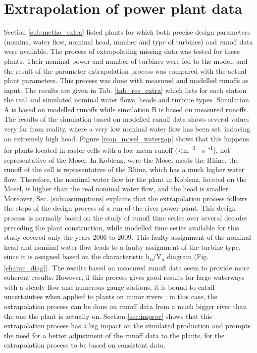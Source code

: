 \section{Extrapolation of power plant data}
\label{sec:missing_data}
Section \ref{sub:metho_extra} listed plants for which both precise design parameters (nominal water flow, nominal head, number and type of turbines) and runoff data were available. The process of extrapolating missing data was tested for these plants. Their nominal power and number of turbines were fed to the model, and the result of the parameter extrapolation process was compared with the actual plant parameters. This process was done with measured and modelled runoffs as input. The results are given in Tab. \ref{tab_res_extra} which lists for each station the real and simulated nominal water flows, heads and turbine types. Simulation A is based on modelled runoffs while simulation B is based on measured runoffs. \newline
The results of the simulation based on modelled runoff data shows several values very far from reality, where a very low nominal water flow has been set, inducing an extremely high head. Figure \ref{map_mosel_watergap} shows that this happens for plants located in raster cells with a low mean runoff (<\unit[10]{m\textsuperscript{3}\textperiodcentered s\textsuperscript{-1}}), not representative of the Mosel. In Koblenz, were the Mosel meets the Rhine, the runoff of the cell is representative of the Rhine, which has a much higher water flow. Therefore, the nominal water flow for the plant in Koblenz, located on the Mosel, is higher than the real nominal water flow, and the head is smaller. Moreover, Sec. \ref{sub:assumptions} explains that the extrapolation process follows the steps of the design process of a run-of-the-river power plant. This design process is normally based on the study of runoff time series over several decades preceding the plant construction, while modelled time series available for this study covered only the years 2006 to 2009. \newline
This faulty assignment of the nominal head and nominal water flow leads to a faulty assignment of the turbine type, since it is assigned based on the characteristic h\textsubscript{n}/\.V\textsubscript{n} diagram (Fig. \ref{charac_diag}). \newline
The results based on measured runoff data seem to provide more coherent results. However, if this process gives good results for large waterways with a steady flow and numerous gauge stations, it is bound to entail uncertainties when applied to plants on minor rivers : in this case, the extrapolation process can be done on runoff data from a much bigger river than the one the plant is actually on.\newline
Section \ref{sec:improv} shows that this extrapolation process has a big impact on the simulated production and prompts the need for a better adjustment of the runoff data to the plants, for the extrapolation process to be based on consistent data.


